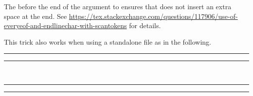 \documentclass[10pt]{ltxdoc}
\newcommand{\showfile}[1]{
  \begin{tcolorbox}[title=\texttt{#1}]
  
  \end{tcolorbox}
}
\def\sz{%
  \rule{0.2em}{7pt}%
  \llap{\rule[8pt]{0.2em}{2pt}}%
}
\begin{document}
The  before the end of the argument to 
ensures that  does not insert an extra space at the end.
See
\url{https://tex.stackexchange.com/questions/117906/use-of-everyeof-and-endlinechar-with-scantokens}
for details.

This trick also works when using a standalone file as in the following.

\showfile{example-standalone-catcode.tex}

\begin{tcblisting}{}
\sz\ExternalCompile[file=example-standalone-catcode]\sz~%
\sz\ExternalRead[file=example-standalone-catcode]\sz
\end{tcblisting}
\end{document}
